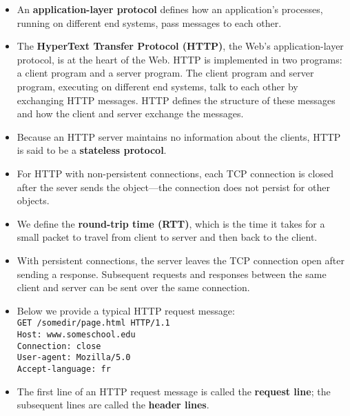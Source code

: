 \begin{itemize}
\item An \textbf{application-layer protocol} defines how an application's processes, running on different end systems, pass messages to each other.

\item The \textbf{HyperText Transfer Protocol (HTTP)}, the Web's application-layer protocol, is at the heart of the Web. HTTP is implemented in two programs: a client program and a server program. The client program and server program, executing on different end systems, talk to each other by exchanging HTTP messages. HTTP defines the structure of these messages and how the client and server exchange the messages.

\item Because an HTTP server maintains no information about the clients, HTTP is said to be a \textbf{stateless protocol}.

\item For HTTP with non-persistent connections, each TCP connection is closed after the sever sends the object---the connection does not persist for other objects.

\item We define the \textbf{round-trip time (RTT)}, which is the time it takes for a small packet to travel from client to server and then back to the client.

\item With persistent connections, the server leaves the TCP connection open after sending a response. Subsequent requests and responses between the same client and server can be sent over the same connection.

\item Below we provide a typical HTTP request message:\\
\hspace*{1em}\texttt{GET /somedir/page.html HTTP/1.1}\\
\hspace*{1em}\texttt{Host: www.someschool.edu}\\
\hspace*{1em}\texttt{Connection: close}\\
\hspace*{1em}\texttt{User-agent: Mozilla/5.0}\\
\hspace*{1em}\texttt{Accept-language: fr}

\item The first line of an HTTP request message is called the \textbf{request line}; the subsequent lines are called the \textbf{header lines}.


\end{itemize}
